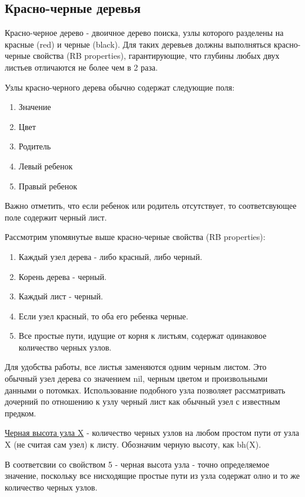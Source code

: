 	

	\subsection{Красно-черные деревья}
		Красно-черное дерево - двоичное дерево поиска, узлы которого 
		разделены на красные (red) и черные (black). Для таких деревьев
		должны выполняться красно-черные свойства (RB properties), 
		гарантирующие, что глубины любых двух листьев отличаются не более
		чем в 2 раза.

		Узлы красно-черного дерева обычно содержат следующие поля:
		\begin{enumerate}
			\item Значение
			\item Цвет
			\item Родитель
			\item Левый ребенок
			\item Правый ребенок
		\end{enumerate}	

		Важно отметить, что если ребенок или родитель отсутствует, то
		соответсвующее поле содержит черный лист.
		
		Рассмотрим упомянутые выше красно-черные свойства (RB properties):
		\begin{enumerate}
			\item Каждый узел дерева - либо красный, либо черный.
			\item Корень дерева - черный.
			\item Каждый лист - черный.
			\item Если узел красный, то оба его ребенка черные.
			\item Все простые пути, идущие от корня к листьям, содержат 
				  одинаковое количество черных узлов.
		\end{enumerate}
		
		Для удобства работы, все листья заменяются одним черным листом.
		Это обычный узел дерева со значением nil, черным цветом и произвольными данными
		о потомках. Использование подобного узла позволяет рассматривать дочерний 
		по отношению к узлу черный лист как обычный узел с известным предком.
		
		\underline{Черная высота узла X} - количество черных узлов на любом простом 
		пути от узла X (не считая сам узел) к листу. Обозначим черную высоту,
		как bh(X).

		В соответсвии со свойством 5 - черная высота узла - точно определяемое значение,
		поскольку все нисходящие простые пути из узла содержат олно и то же 
		количество черных узлов.
	
